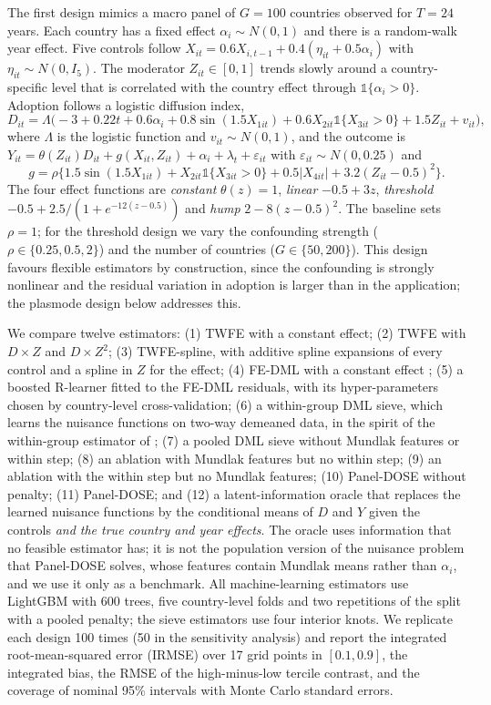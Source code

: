 \documentclass[preprint,12pt,authoryear]{elsarticle}
\begin{document}
The first design mimics a macro panel of $G=100$ countries observed for $T=24$ years. Each country has a fixed effect $\alpha_i\sim N(0,1)$ and there is a random-walk year effect. Five controls follow $X_{it}=0.6X_{i,t-1}+0.4(\eta_{it}+0.5\alpha_i)$ with $\eta_{it}\sim N(0,I_5)$. The moderator $Z_{it}\in[0,1]$ trends slowly around a country-specific level that is correlated with the country effect through $\mathbb{1}\{\alpha_i>0\}$. Adoption follows a logistic diffusion index,
\[
D_{it}=\Lambda\big(-3+0.22t+0.6\alpha_i+0.8\sin(1.5X_{1it})+0.6X_{2it}\mathbb{1}\{X_{3it}>0\}+1.5Z_{it}+v_{it}\big),
\]
where $\Lambda$ is the logistic function and $v_{it}\sim N(0,1)$, and the outcome is $Y_{it}=\theta(Z_{it})D_{it}+g(X_{it},Z_{it})+\alpha_i+\lambda_t+\varepsilon_{it}$ with $\varepsilon_{it}\sim N(0,0.25)$ and
\[
g=\rho\big\{1.5\sin(1.5X_{1it})+X_{2it}\mathbb{1}\{X_{3it}>0\}+0.5|X_{4it}|+3.2(Z_{it}-0.5)^2\big\}.
\]
The four effect functions are \emph{constant} $\theta(z)=1$, \emph{linear} $-0.5+3z$, \emph{threshold} $-0.5+2.5/(1+e^{-12(z-0.5)})$ and \emph{hump} $2-8(z-0.5)^2$. The baseline sets $\rho=1$; for the threshold design we vary the confounding strength ($\rho\in\{0.25,0.5,2\}$) and the number of countries ($G\in\{50,200\}$). This design favours flexible estimators by construction, since the confounding is strongly nonlinear and the residual variation in adoption is larger than in the application; the plasmode design below addresses this.

We compare twelve estimators: (1) TWFE with a constant effect; (2) TWFE with $D\times Z$ and $D\times Z^2$; (3) TWFE-spline, with additive spline expansions of every control and a spline in $Z$ for the effect; (4) FE-DML with a constant effect \citep{clarke2023panel}; (5) a boosted R-learner \citep{nie2021quasi} fitted to the FE-DML residuals, with its hyper-parameters chosen by country-level cross-validation; (6) a within-group DML sieve, which learns the nuisance functions on two-way demeaned data, in the spirit of the within-group estimator of \citet{clarke2023panel}; (7) a pooled DML sieve without Mundlak features or within step; (8) an ablation with Mundlak features but no within step; (9) an ablation with the within step but no Mundlak features; (10) Panel-DOSE without penalty; (11) Panel-DOSE; and (12) a latent-information oracle that replaces the learned nuisance functions by the conditional means of $D$ and $Y$ given the controls \emph{and the true country and year effects}. The oracle uses information that no feasible estimator has; it is not the population version of the nuisance problem that Panel-DOSE solves, whose features contain Mundlak means rather than $\alpha_i$, and we use it only as a benchmark. All machine-learning estimators use LightGBM \citep{ke2017lightgbm} with 600 trees, five country-level folds and two repetitions of the split with a pooled penalty; the sieve estimators use four interior knots. We replicate each design 100 times (50 in the sensitivity analysis) and report the integrated root-mean-squared error (IRMSE) over 17 grid points in $[0.1,0.9]$, the integrated bias, the RMSE of the high-minus-low tercile contrast, and the coverage of nominal 95\% intervals with Monte Carlo standard errors.
\end{document}
